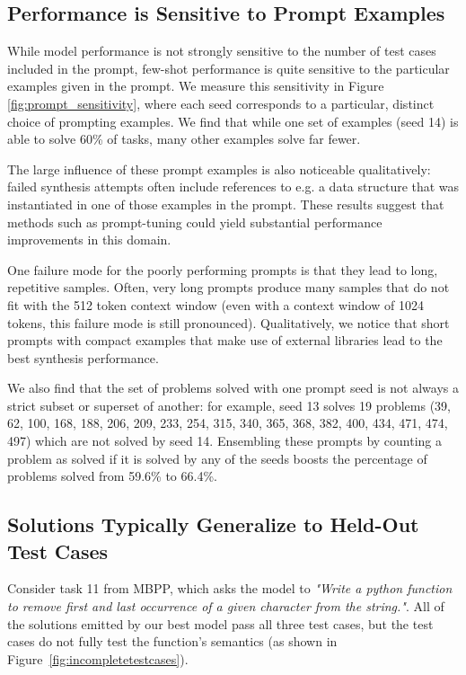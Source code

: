 \subsection{Performance is Sensitive to Prompt Examples} While model performance is not strongly sensitive to the number of test cases included in the prompt, few-shot performance is quite sensitive to the particular examples given in the prompt. We measure this sensitivity in Figure \ref{fig:prompt_sensitivity}, where each seed corresponds to a particular, distinct choice of prompting examples. We find that while one set of examples (seed 14) is able to solve 60\% of tasks, many other examples solve far fewer.

The large influence of these prompt examples is also noticeable qualitatively: failed synthesis attempts often include references to e.g. a data structure that was instantiated in one of those examples in the prompt. These results suggest that methods such as prompt-tuning \citep{prefix_tuning,prompt_tuning} could yield substantial performance improvements in this domain.

One failure mode for the poorly performing prompts is that they lead to long, repetitive samples. Often, very long prompts produce many samples that do not fit with the 512 token context window (even with a context window of 1024 tokens, this failure mode is still pronounced). Qualitatively, we notice that short prompts with compact examples that make use of external libraries lead to the best synthesis performance. 

We also find that the set of problems solved with one prompt seed is not always a strict subset or superset of another: for example, seed 13 solves 19 problems (39, 62, 100, 168, 188, 206, 209, 233, 254, 315, 340, 365, 368, 382, 400, 434, 471, 474, 497) which are not solved by seed 14. Ensembling these prompts by counting a problem as solved if it is solved by any of the seeds boosts the percentage of problems solved from 59.6\% to 66.4\%.

\subsection{Solutions Typically Generalize to Held-Out Test Cases}
\label{sec:generalize}

Consider task 11 from MBPP, which asks the model to \textit{"Write a python function to remove first and last occurrence of a given character from the string."}. All of the solutions emitted by our best model pass all three test cases, but the test cases do not fully test the function's semantics (as shown in Figure~\ref{fig:incompletetestcases}).


